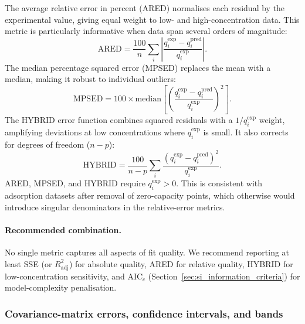 \documentclass[journal=jacsat,manuscript=article]{achemso}
\begin{document}
The average relative error in percent (ARED) normalises each residual
by the experimental value, giving equal weight to low- and
high-concentration data.  This metric is particularly informative when
data span several orders of magnitude:
\begin{equation}
	\text{ARED} = \frac{100}{n}\sum_{i}
	\left|\frac{q_i^{\exp} - q_i^{\mathrm{pred}}}{q_i^{\exp}}\right|.
	\label{eq:si_ARED}
\end{equation}
The median percentage squared error (MPSED) replaces the mean with a
median, making it robust to individual outliers:
\begin{equation}
	\text{MPSED} = 100 \times \mathrm{median}\!\left[
	\left(\frac{q_i^{\exp} - q_i^{\mathrm{pred}}}{q_i^{\exp}}\right)^{\!2}
	\right].
	\label{eq:si_MPSED}
\end{equation}
The HYBRID error function combines squared residuals with a $1/q_i^{\exp}$
weight, amplifying deviations at low concentrations where
$q_i^{\exp}$ is small.  It also corrects for degrees of freedom ($n - p$):
\begin{equation}
	\text{HYBRID} = \frac{100}{n-p}\sum_{i}
	\frac{(q_i^{\exp} - q_i^{\mathrm{pred}})^2}{q_i^{\exp}}.
	\label{eq:si_HYBRID}
\end{equation}
ARED, MPSED, and HYBRID require $q_i^{\exp} > 0$. This is consistent
with adsorption datasets after removal of zero-capacity points, which
otherwise would introduce singular denominators in the relative-error
metrics.

\paragraph{Recommended combination.}
No single metric captures all aspects of fit quality.  We recommend
reporting at least SSE (or $R^2_{\mathrm{adj}}$) for absolute quality,
ARED for relative quality, HYBRID for low-concentration sensitivity,
and AIC$_c$ (Section~\ref{sec:si_information_criteria}) for
model-complexity penalisation.

\subsubsection{Covariance-matrix errors, confidence intervals, and bands}
\end{document}
